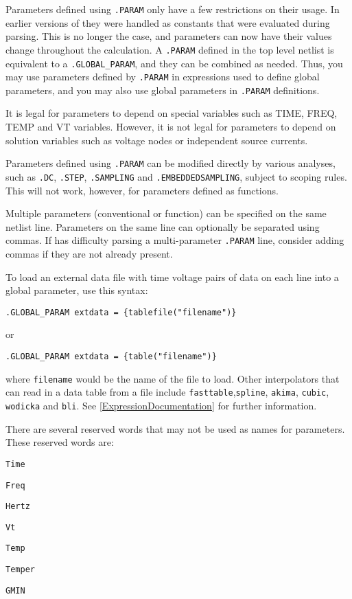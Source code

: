 \begin{Command}
\begin{Arguments}
\end{Arguments}

\comments
Parameters defined using \texttt{.PARAM} only have a few restrictions on their 
  usage.  In earlier versions of \Xyce{} they were handled as constants that 
  were evaluated during parsing.  This is no longer the case, and parameters 
  can now have their values change throughout the calculation.   A \texttt{.PARAM} 
  defined in the top level netlist is equivalent to 
  a \texttt{.GLOBAL\_PARAM}, and they can be combined as needed.
Thus, you may use parameters defined by \texttt{.PARAM} in expressions used to
define global parameters, and you may also use global parameters in
\texttt{.PARAM} definitions.  

It is legal for parameters to depend on special variables such as 
TIME, FREQ, TEMP and VT variables.  However, it is not legal for parameters 
to depend on solution variables such as voltage nodes or independent source currents.

Parameters defined using \texttt{.PARAM} can be modified directly by various analyses, such as \texttt{.DC},   
\texttt{.STEP}, \texttt{.SAMPLING} and \texttt{.EMBEDDEDSAMPLING}, subject to scoping rules.  
This will not work, however, for parameters defined as functions.

Multiple parameters (conventional or function) can be specified on the same netlist line.  
Parameters on the same line can optionally be separated using commas.  If \Xyce{} has difficulty 
parsing a multi-parameter \texttt{.PARAM} line, consider adding commas if they are not already present.


To load an external data file with time voltage pairs of data on each 
line into a global parameter, use this syntax:

\texttt{.GLOBAL\_PARAM extdata = \{tablefile("filename")\}}

or

\texttt{.GLOBAL\_PARAM extdata = \{table("filename")\}}

where \texttt{filename} would be the name of the file to load.  
Other interpolators that can read in a data table from a file 
include \texttt{fasttable},\texttt{spline}, \texttt{akima}, \texttt{cubic}, 
\texttt{wodicka} and \texttt{bli}.  See \ref{ExpressionDocumentation} 
for further information.  

There are several reserved words that may not be used as names for parameters.  These reserved words are:
\begin{XyceItemize}
\item \verb+Time+
\item \verb+Freq+ 
\item \verb+Hertz+ 
\item \verb+Vt+
\item \verb+Temp+
\item \verb+Temper+
\item \verb+GMIN+
\end{XyceItemize}


\end{Command}
